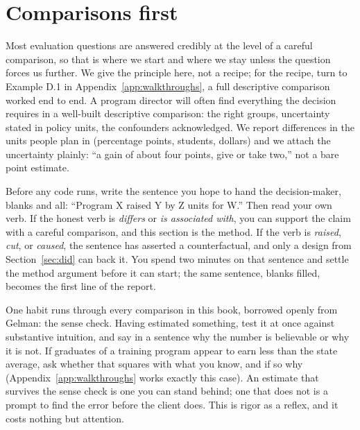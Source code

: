\section{Comparisons first}\label{sec:comparisons}
Most evaluation questions are answered credibly at the level of a careful comparison, so that is where we start and where we stay unless the question forces us further. We give the principle here, not a recipe; for the recipe, turn to Example D.1 in Appendix~\ref{app:walkthroughs}, a full descriptive comparison worked end to end. A program director will often find everything the decision requires in a well-built descriptive comparison: the right groups, uncertainty stated in policy units, the confounders acknowledged. We report differences in the units people plan in (percentage points, students, dollars) and we attach the uncertainty plainly: \enquote{a gain of about four points, give or take two,} not a bare point estimate.

Before any code runs, write the sentence you hope to hand the decision-maker, blanks and all: \enquote{Program X raised Y by Z units for W.} Then read your own verb. If the honest verb is \emph{differs} or \emph{is associated with}, you can support the claim with a careful comparison, and this section is the method. If the verb is \emph{raised}, \emph{cut}, or \emph{caused}, the sentence has asserted a counterfactual, and only a design from Section~\ref{sec:did} can back it. You spend two minutes on that sentence and settle the method argument before it can start; the same sentence, blanks filled, becomes the first line of the report.

One habit runs through every comparison in this book, borrowed openly from Gelman: the sense check. Having estimated something, test it at once against substantive intuition, and say in a sentence why the number is believable or why it is not. If graduates of a training program appear to earn less than the state average, ask whether that squares with what you know, and if so why (Appendix~\ref{app:walkthroughs} works exactly this case). An estimate that survives the sense check is one you can stand behind; one that does not is a prompt to find the error before the client does. This is rigor as a reflex, and it costs nothing but attention.

